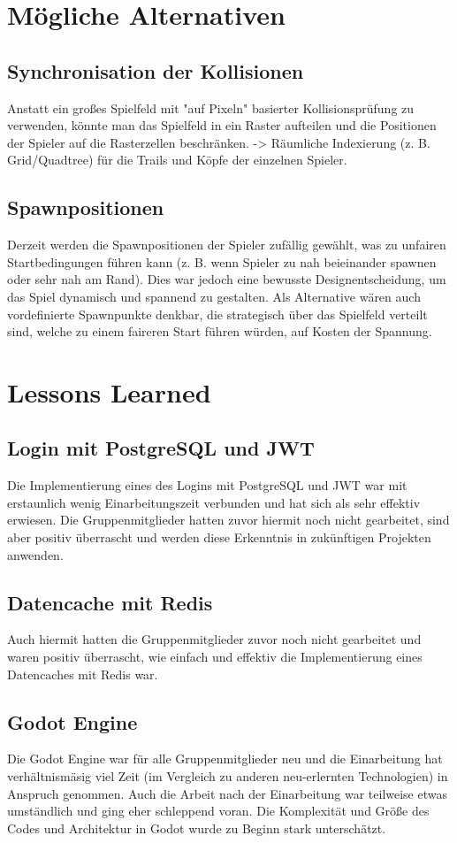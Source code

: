 \section{Mögliche Alternativen}
\subsection*{Synchronisation der Kollisionen}
Anstatt ein großes Spielfeld mit "auf Pixeln" basierter Kollisionsprüfung zu verwenden, könnte man das Spielfeld in ein Raster aufteilen und die Positionen der Spieler auf die Rasterzellen beschränken.
-> Räumliche Indexierung (z. B. Grid/Quadtree) für die Trails und Köpfe der einzelnen Spieler.

\subsection*{Spawnpositionen}
Derzeit werden die Spawnpositionen der Spieler zufällig gewählt, was zu unfairen Startbedingungen führen kann (z. B. wenn Spieler zu nah beieinander spawnen oder sehr nah am Rand). 
Dies war jedoch eine bewusste Designentscheidung, um das Spiel dynamisch und spannend zu gestalten.
Als Alternative wären auch vordefinierte Spawnpunkte denkbar, die strategisch über das Spielfeld verteilt sind, welche zu einem faireren Start führen würden, auf Kosten der Spannung.  

\section{Lessons Learned}
\subsection*{Login mit PostgreSQL und JWT}
Die Implementierung eines des Logins mit PostgreSQL und JWT war mit erstaunlich wenig Einarbeitungszeit verbunden und hat sich als sehr effektiv erwiesen.
Die Gruppenmitglieder hatten zuvor hiermit noch nicht gearbeitet, sind aber positiv überrascht und werden diese Erkenntnis in zukünftigen Projekten anwenden.

\subsection*{Datencache mit Redis}
Auch hiermit hatten die Gruppenmitglieder zuvor noch nicht gearbeitet und waren positiv überrascht, wie einfach und effektiv die Implementierung eines Datencaches mit Redis war.

\subsection*{Godot Engine}
Die Godot Engine war für alle Gruppenmitglieder neu und die Einarbeitung hat verhältnismäsig viel Zeit (im Vergleich zu anderen neu-erlernten Technologien) in Anspruch genommen.
Auch die Arbeit nach der Einarbeitung war teilweise etwas umständlich und ging eher schleppend voran. 
Die Komplexität und Größe des Codes und Architektur in Godot wurde zu Beginn stark unterschätzt.